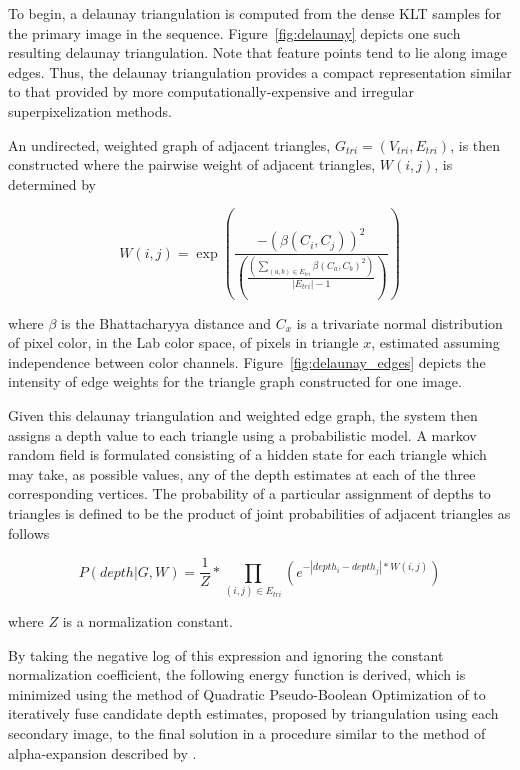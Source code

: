 \documentclass[conference]{acmsiggraph}
\begin{document}
To begin, a delaunay triangulation is computed from the dense KLT samples
for the primary image in the sequence.
Figure~\ref{fig:delaunay} depicts one such resulting delaunay triangulation.
Note that feature points tend to lie along image edges.  Thus, the
delaunay triangulation provides a compact representation similar
to that provided by more computationally-expensive and irregular
superpixelization methods.

An undirected, weighted graph of adjacent triangles,
$G_{tri} = (V_{tri}, E_{tri})$, is then constructed
where the pairwise weight of adjacent triangles, $W(i, j)$, is determined by

\begin{equation}
    W(i, j) = \exp \left(
        \dfrac{-(\beta(C_i, C_j))^2}
        {
            \left(
                \frac{
                    (\sum_{(a, b) \in E_{tri}} \beta(C_a, C_b)^2)
                }
                {
                    |E_{tri}| - 1
                }
            \right)
        }
    \right)
\end{equation}

where $\beta$ is the Bhattacharyya distance \cite{bhattacharyya1946measure}
and $C_x$ is a trivariate normal distribution of pixel color, in the Lab color
space, of pixels in triangle $x$, estimated assuming independence between color
channels. Figure~\ref{fig:delaunay_edges} depicts the intensity of edge weights
for the triangle graph constructed for one image.

Given this delaunay triangulation and weighted edge graph, the system
then assigns a depth value to each triangle using a probabilistic model.
A markov random field is formulated consisting of a hidden state
for each triangle which may take, as possible values, any of the depth
estimates at each of the three corresponding vertices.
The probability of a particular assignment of depths to triangles is
defined to be the product of joint probabilities of adjacent triangles
as follows

\begin{equation}
    \label{eq:mrf}
    P(depth |G, W) = \frac{1}{Z} * \prod_{(i, j) \in E_{tri}}
    \left(
        e^{-|depth_i - depth_j| * W(i, j)}
    \right)
\end{equation}

where $Z$ is a normalization constant.

By taking the negative log of this expression
and ignoring the constant normalization coefficient, the
following energy function is derived, which is
minimized using the method of Quadratic Pseudo-Boolean Optimization
of \cite{rother2007optimizing} to iteratively fuse
candidate depth estimates, proposed by triangulation
using each secondary image, to the final solution
in a procedure similar to the method of alpha-expansion
described by \cite{boykov2001fast}.
\end{document}
